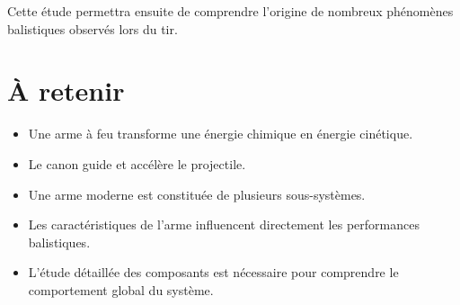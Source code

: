 Cette étude permettra ensuite de comprendre l'origine de nombreux phénomènes
balistiques observés lors du tir.

\section{À retenir}

\begin{aretenir}

\begin{itemize}
    \item Une arme à feu transforme une énergie chimique en énergie
    cinétique.
    \item Le canon guide et accélère le projectile.
    \item Une arme moderne est constituée de plusieurs sous-systèmes.
    \item Les caractéristiques de l'arme influencent directement les
    performances balistiques.
    \item L'étude détaillée des composants est nécessaire pour comprendre le
    comportement global du système.
\end{itemize}

\end{aretenir}
